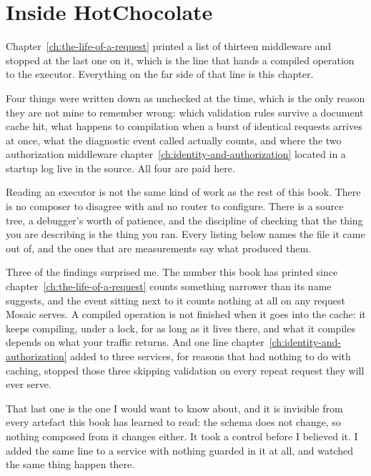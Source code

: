 \chapter{Inside HotChocolate}
\label{ch:inside-hotchocolate}

Chapter~\ref{ch:the-life-of-a-request} printed a list of thirteen middleware and
stopped at the last one on it, which is the line that hands a compiled operation
to the executor. Everything on the far side of that line is this chapter.

Four things were written down as unchecked at the time, which is the only reason
they are not mine to remember wrong: which validation rules survive a document
cache hit, what happens to compilation when a burst of identical requests
arrives at once, what the diagnostic event called  actually
counts, and where the two authorization middleware
chapter~\ref{ch:identity-and-authorization} located in a startup log live in the
source. All four are paid here.

%
Reading an executor is not the same kind of work as the rest of this book. There
is no composer to disagree with and no router to configure. There is a source
tree, a debugger's worth of patience, and the discipline of checking that the
thing you are describing is the thing you ran. Every listing below names the
file it came out of, and the ones that are measurements say what produced them.

Three of the findings surprised me. The number this book has printed since
chapter~\ref{ch:the-life-of-a-request} counts something narrower than its name
suggests, and the event sitting next to it counts nothing at all on any request
Mosaic serves. A compiled operation is not finished when it goes into the cache:
it keeps compiling, under a lock, for as long as it lives there, and what it
compiles depends on what your traffic returns. And one line
chapter~\ref{ch:identity-and-authorization} added to three services, for reasons
that had nothing to do with caching, stopped those three skipping validation on
every repeat request they will ever serve.

That last one is the one I would want to know about, and it is invisible from
every artefact this book has learned to read: the schema does not change, so
nothing composed from it changes either. It took a control before I believed it.
I added the same line to a service with nothing guarded in it at all, and
watched the same thing happen there.

